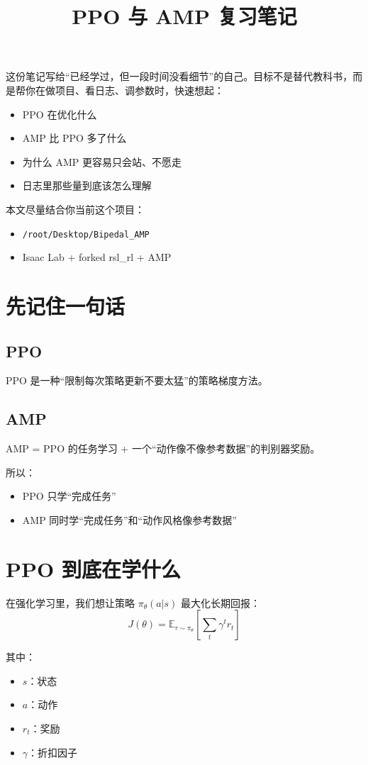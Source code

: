 \documentclass[11pt,a4paper]{article}
\title{PPO 与 AMP 复习笔记}
\author{}
\date{}
\begin{document}
\maketitle

这份笔记写给“已经学过，但一段时间没看细节”的自己。目标不是替代教科书，而是帮你在做项目、看日志、调参数时，快速想起：

\begin{itemize}
\item PPO 在优化什么
\item AMP 比 PPO 多了什么
\item 为什么 AMP 更容易只会站、不愿走
\item 日志里那些量到底该怎么理解
\end{itemize}

本文尽量结合你当前这个项目：
\begin{itemize}
\item \texttt{/root/Desktop/Bipedal\_AMP}
\item Isaac Lab + forked rsl\_rl + AMP
\end{itemize}

\section{先记住一句话}
\subsection{PPO}
PPO 是一种“限制每次策略更新不要太猛”的策略梯度方法。

\subsection{AMP}
AMP = PPO 的任务学习 + 一个“动作像不像参考数据”的判别器奖励。

所以：
\begin{itemize}
\item PPO 只学“完成任务”
\item AMP 同时学“完成任务”和“动作风格像参考数据”
\end{itemize}

\section{PPO 到底在学什么}
在强化学习里，我们想让策略 $\pi_\theta(a|s)$ 最大化长期回报：
\[
J(\theta)=\mathbb{E}_{\tau \sim \pi_\theta}\left[\sum_t \gamma^t r_t\right]
\]

其中：
\begin{itemize}
\item $s$：状态
\item $a$：动作
\item $r_t$：奖励
\item $\gamma$：折扣因子
\end{itemize}
\end{document}
